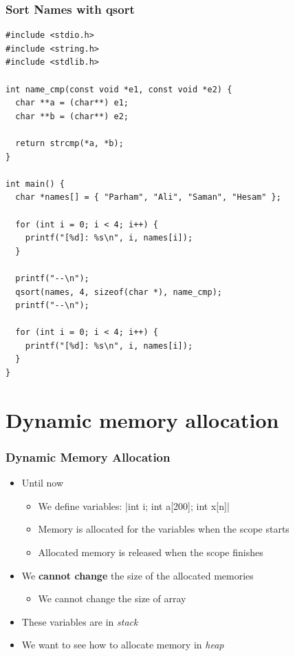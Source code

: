 \documentclass{../c-lecture}
\begin{document}
\begin{frame}[fragile]
  \frametitle{Sort Names with qsort}
  \tiny
  \begin{verbatim}
#include <stdio.h>
#include <string.h>
#include <stdlib.h>

int name_cmp(const void *e1, const void *e2) {
  char **a = (char**) e1;
  char **b = (char**) e2;

  return strcmp(*a, *b);
}

int main() {
  char *names[] = { "Parham", "Ali", "Saman", "Hesam" };

  for (int i = 0; i < 4; i++) {
    printf("[%d]: %s\n", i, names[i]);
  }

  printf("--\n");
  qsort(names, 4, sizeof(char *), name_cmp);
  printf("--\n");

  for (int i = 0; i < 4; i++) {
    printf("[%d]: %s\n", i, names[i]);
  }
}
  \end{verbatim}
\end{frame}

\section{Dynamic memory allocation}

\begin{frame}
  \frametitle{Dynamic Memory Allocation}
  \begin{itemize}
    \item Until now
    \begin{itemize}
      \item
        We define variables:
        |int i; int a[200]; int x[n]|

      \item
        Memory is allocated for the variables
        {\color{Purple} when the scope starts}

      \item
        Allocated memory is released
        {\color{Purple} when the scope finishes}

    \end{itemize}
    \item
      We \textbf{\color{RubineRed} cannot change} the size of the allocated
      memories

    \begin{itemize}
      \item We cannot change the size of array
    \end{itemize}
    \item These variables are in \textit{\color{YellowOrange} stack}
    \item
      We want to see how to allocate memory in
      \textit{\color{YellowOrange} heap}
  \end{itemize}
\end{frame}
\end{document}
